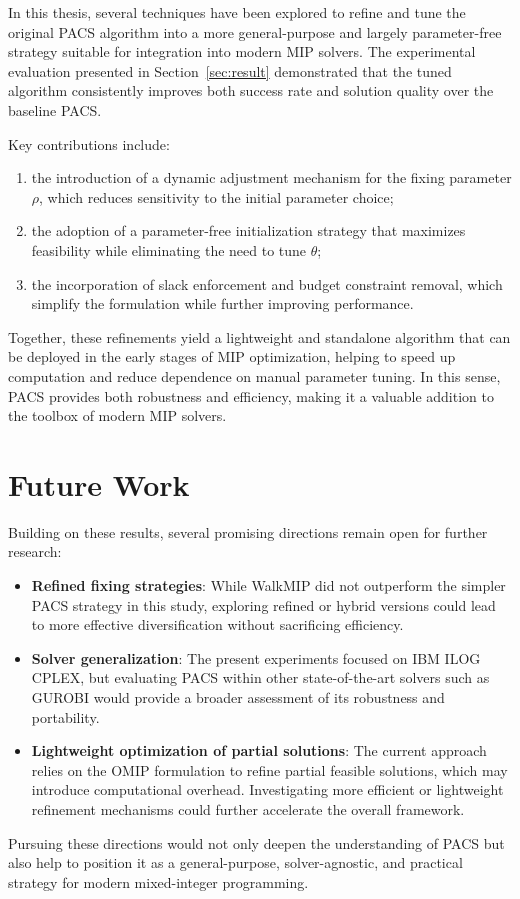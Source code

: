In this thesis, several techniques have been explored to refine and tune the original PACS algorithm into a more general-purpose and largely parameter-free strategy suitable for integration into modern MIP solvers. The experimental evaluation presented in Section~\ref{sec:result} demonstrated that the tuned algorithm consistently improves both success rate and solution quality over the baseline PACS.

Key contributions include:
\begin{enumerate}
    \item the introduction of a dynamic adjustment mechanism for the fixing parameter $\rho$, which reduces sensitivity to the initial parameter choice;
    \item the adoption of a parameter-free initialization strategy that maximizes feasibility while eliminating the need to tune $\theta$;
    \item the incorporation of slack enforcement and budget constraint removal, which simplify the formulation while further improving performance.
\end{enumerate}
Together, these refinements yield a lightweight and standalone algorithm that can be deployed in the early stages of MIP optimization, helping to speed up computation and reduce dependence on manual parameter tuning. In this sense, PACS provides both robustness and efficiency, making it a valuable addition to the toolbox of modern MIP solvers.

\section{Future Work}
Building on these results, several promising directions remain open for further research:
\begin{itemize}
    \item \textbf{Refined fixing strategies}: While WalkMIP did not outperform the simpler PACS strategy in this study, exploring refined or hybrid versions could lead to more effective diversification without sacrificing efficiency.
    \item \textbf{Solver generalization}: The present experiments focused on IBM ILOG CPLEX, but evaluating PACS within other state-of-the-art solvers such as GUROBI would provide a broader assessment of its robustness and portability.
    \item \textbf{Lightweight optimization of partial solutions}: The current approach relies on the OMIP formulation to refine partial feasible solutions, which may introduce computational overhead. Investigating more efficient or lightweight refinement mechanisms could further accelerate the overall framework.
\end{itemize}

Pursuing these directions would not only deepen the understanding of PACS but also help to position it as a general-purpose, solver-agnostic, and practical strategy for modern mixed-integer programming.